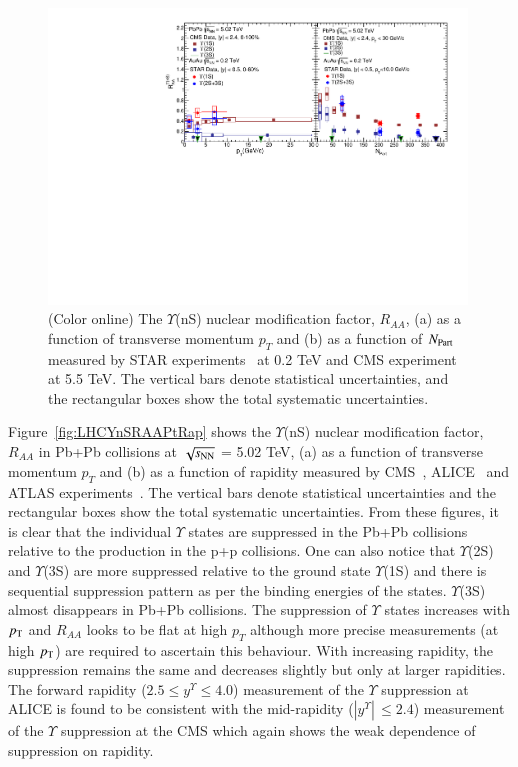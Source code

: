 \begin{figure}
  \includegraphics[width=0.99\textwidth]{Figures/Fig8_RHIC_LHC_YnSRAA.pdf}
  \caption{(Color online) The $\Upsilon$(nS) nuclear modification factor, $R_{AA}$, (a) as a function of transverse momentum $p_{T}$
    and (b) as a function of $N_{\rm Part}$ measured by STAR experiments~\cite{Wang:2019vau} at 0.2 TeV and CMS experiment~\cite{CMS:2018zza} at 5.5 TeV.
    The vertical bars denote statistical uncertainties, and the rectangular boxes show the total systematic uncertainties.
  }
  \label{fig:RHICYnSRAANPart}
\end{figure}


Figure~\ref{fig:LHCYnSRAAPtRap} shows the $\Upsilon$(nS) nuclear modification factor, $R_{AA}$
in Pb+Pb collisions at $\sqrt{s_{\rm NN}}$ = 5.02 TeV, (a) as a function of transverse momentum $p_{T}$
and (b) as a function of rapidity measured by CMS~\cite{CMS:2018zza}, ALICE~\cite{ALICE:2020wwx}
and ATLAS experiments~\cite{ALICE:2020wwx}.
The vertical bars denote statistical uncertainties and the rectangular boxes
show the total systematic uncertainties. From these figures, it is clear 
that the individual $\Upsilon$ states are suppressed in
the Pb+Pb collisions relative to the production in the p+p collisions.
One can also notice that $\Upsilon$(2S) and $\Upsilon$(3S) are 
more suppressed relative to the ground state $\Upsilon$(1S) and there is sequential
suppression pattern as per the binding energies of the states.
$\Upsilon$(3S) almost disappears in Pb+Pb collisions. 
The suppression of $\Upsilon$ states increases with $p_{\rm T}$ and $R_{AA}$ looks
to be flat at high $p_T$ although more precise measurements (at high $p_{\rm T}$) are required to ascertain
this behaviour. 
With increasing rapidity, the suppression remains the same and decreases
slightly but only at larger rapidities.
The forward rapidity ($2.5 \leq y^{\Upsilon} \leq 4.0$) measurement of the $\Upsilon$ suppression at 
ALICE is found to be consistent with the mid-rapidity ($|y^{\Upsilon}|\,\leq 2.4$)
measurement of the $\Upsilon$ suppression at the CMS which again shows the weak dependence
of suppression on rapidity.


